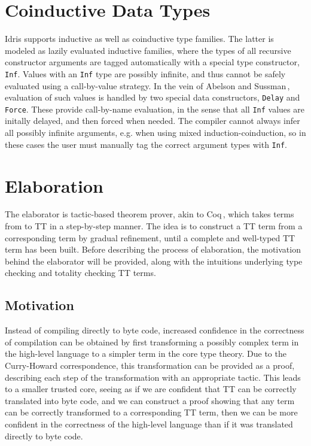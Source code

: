 \section{Coinductive Data Types}
Idris supports inductive as well as coinductive type families. The latter is
modeled as lazily evaluated inductive families, where the types of all recursive
constructor arguments are tagged automatically with a special type constructor,
\texttt{Inf}. Values with an \texttt{Inf} type are possibly infinite, and thus
cannot be safely evaluated using a call-by-value strategy. In the vein of Abelson
and Sussman\,\citep{Abelson96SICP}, evaluation of such values is handled by two
special data constructors, \texttt{Delay} and \texttt{Force}. These provide
call-by-name evaluation, in the sense that all \texttt{Inf} values are initally
delayed, and then forced when needed. The compiler cannot always infer all possibly infinite arguments, e.g. when using mixed
induction-coinduction, so in these cases the user must manually tag the correct
argument types with \texttt{Inf}.

\section{Elaboration}
\label{sec:elaboration}
The elaborator is tactic-based theorem prover, akin to Coq\,\citep{Coq:manual},
which takes terms from \IdrisM{} to TT in a step-by-step manner. The idea is to
construct a TT term from a corresponding \IdrisM{} term by gradual refinement,
until a complete and well-typed TT term has been built. Before describing the
process of elaboration, the motivation behind the elaborator will be provided,
along with the intuitions underlying type checking and totality checking TT terms. 

\subsection{Motivation}
Instead of compiling \IdrisM{} directly to byte code, increased confidence in
the correctness of compilation can be obtained by first transforming a possibly
complex term in the high-level language to a simpler term in the core type
theory. Due to the Curry-Howard correspondence, this transformation can be
provided as a proof, describing each step of the transformation with an
appropriate tactic. This leads to a smaller trusted core, seeing as if we are
confident that TT can be correctly translated into byte code, and we can
construct a proof showing that any \IdrisM{} term can be correctly transformed
to a corresponding TT term, then we can be more confident in the correctness of
the high-level \IdrisM{} language than if it was translated directly to byte
code.

